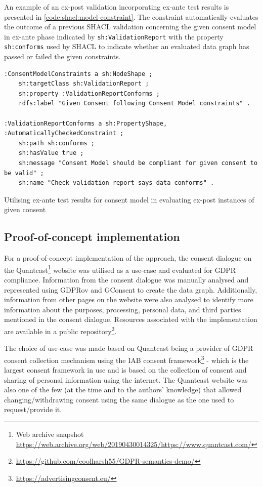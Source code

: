 An example of an ex-post validation incorporating ex-ante test results is presented in \autoref{code:shacl:model-constraint}.
The constraint automatically evaluates the outcome of a previous SHACL validation concerning the given consent model in ex-ante phase indicated by \texttt{sh:ValidationReport} with the property \texttt{sh:conforms} used by SHACL to indicate whether an evaluated data graph has passed or failed the given constraints.
\begin{listing}[htbp]
\begin{verbatim}
:ConsentModelConstraints a sh:NodeShape ;
    sh:targetClass sh:ValidationReport ; 
    sh:property :ValidationReportConforms ;
    rdfs:label "Given Consent following Consent Model constraints" .

:ValidationReportConforms a sh:PropertyShape, :AutomaticallyCheckedConstraint ;
    sh:path sh:conforms ;
    sh:hasValue true ; 
    sh:message "Consent Model should be compliant for given consent to be valid" ; 
    sh:name "Check validation report says data conforms" .
\end{verbatim}
\caption{Utilising ex-ante test results for consent model in evaluating ex-post instances of given consent}
\label{code:shacl:model-constraint}
\end{listing}

\subsection{Proof-of-concept implementation}\label{sec:testing:shacl:demo}
For a proof-of-concept implementation of the approach, the consent dialogue on the Quantcast\footnote{Web archive snapshot \url{https://web.archive.org/web/20190430014325/https://www.quantcast.com/}} website was utilised as a use-case and evaluated for GDPR compliance.
Information from the consent dialogue was manually analysed and represented using GDPRov and GConsent to create the data graph. Additionally, information from other pages on the website were also analysed to identify more information about the purposes, processing, personal data, and third parties mentioned in the consent dialogue.
Resources associated with the implementation are available in a public repository\footnote{\url{https://github.com/coolharsh55/GDPR-semantics-demo/}}.

The choice of use-case was made based on Quantcast being a provider of GDPR consent collection mechanism using the IAB consent framework\footnote{\url{https://advertisingconsent.eu/}} - which is the largest consent framework in use and is based on the collection of consent and sharing of personal information using the internet. The Quantcast website was also one of the few (at the time and to the authors’ knowledge) that allowed changing/withdrawing consent using the same dialogue as the one used to request/provide it.

